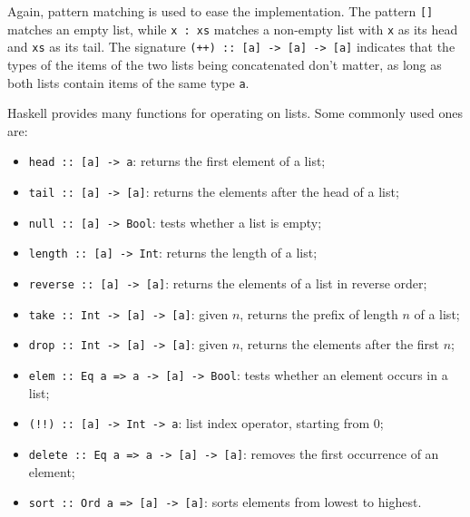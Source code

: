 \documentclass[UdineBachThesis,american,11pt]{PhdThesis}
\begin{document}
  Again, pattern matching is used to ease the implementation. The pattern
  \mbox{\texttt{[]}} matches an empty list, while \mbox{\texttt{x : xs}} matches
  a non-empty list with \texttt{x} as its head and \mbox{\texttt{xs}} as its
  tail. The signature \mbox{\texttt{(++) :: [a] -> [a] -> [a]}} indicates that
  the types of the items of the two lists being concatenated don't matter, as
  long as both lists contain items of the same type \texttt{a}.

  Haskell provides many functions for operating on lists. Some commonly used
  ones are:

  \begin{itemize}
    \item \mbox{\texttt{head :: [a] -> a}}: returns the first element of a list;

    \item \mbox{\texttt{tail :: [a] -> [a]}}: returns the elements after the
    head of a list;

    \item \mbox{\texttt{null :: [a] -> Bool}}: tests whether a list is empty;

    \item \mbox{\texttt{length :: [a] -> Int}}: returns the length of a list;

    \item \mbox{\texttt{reverse :: [a] -> [a]}}: returns the elements of a list
    in reverse order;

    \item \mbox{\texttt{take :: Int -> [a] -> [a]}}: given $n$, returns the
    prefix of length $n$ of a list;

    \item \mbox{\texttt{drop :: Int -> [a] -> [a]}}: given $n$, returns the
    elements after the first $n$;

    \item \mbox{\texttt{elem :: Eq a => a -> [a] -> Bool}}: tests whether an
    element occurs in a list;

    \item \mbox{\texttt{(!!) :: [a] -> Int -> a}}: list index operator, starting
    from $0$;

    \item \mbox{\texttt{delete :: Eq a => a -> [a] -> [a]}}: removes the first
    occurrence of an element;

    \item \mbox{\texttt{sort :: Ord a => [a] -> [a]}}: sorts elements from
    lowest to highest.
  \end{itemize}
\end{document}
